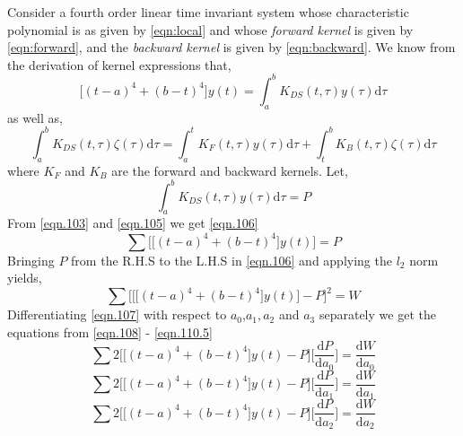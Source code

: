 \documentclass[letterpaper%
, twoside%
, 12pt%
,memoire%
, english%
,creativecommons,hyperref%
]{thETS}
\theoremstyle{newThmStyle}
\begin{document}
Consider a fourth order linear time invariant system whose characteristic polynomial is as given by \eqref{eqn:local} and whose \textit{forward kernel} is given by \eqref{eqn:forward}, and the \textit{backward kernel} is given by \eqref{eqn:backward}. 
We know from the derivation of kernel expressions \citep{RN120} that, 
\begin{equation}\label{eqn.103}
\bigg[(t-a)^4+(b-t)^4\bigg]y(t) = \int_{a}^{b} K_{DS}(t,\tau)y(\tau)\mathrm{d}\tau
\end{equation}
as well as,
\begin{equation}\label{eqn.104}
\int_{a}^{b} K_{DS}(t,\tau)\zeta(\tau)\mathrm{d}\tau = \int_{a}^{t}K_{F}(t,\tau)y(\tau)\mathrm{d}\tau + \int_{t}^{b}K_{B}(t,\tau)\zeta(\tau)\mathrm{d}\tau 
\end{equation}
where $K_F$ and $K_B$ are the forward and backward kernels. Let,
\begin{equation}\label{eqn.105}
\int_{a}^{b} K_{DS}(t,\tau)y(\tau)\mathrm{d}\tau = P
\end{equation}
From \eqref{eqn.103} and \eqref{eqn.105} we get \eqref{eqn.106}
\begin{equation}\label{eqn.106}
\sum\bigg[\big[(t-a)^4 + (b-t)^4\big]y(t)\bigg] = P
\end{equation}
Bringing $P$ from the R.H.S to the L.H.S in \eqref{eqn.106} and applying the $l_2$ norm yields,
\begin{equation}\label{eqn.107}
\sum\bigg[\bigg[\big[(t-a)^4 + (b-t)^4\big]y(t)\bigg] - P\bigg]^2 = W 
\end{equation}
Differentiating \eqref{eqn.107} with respect to $a_{0}$,$a_{1},a_{2}$ and $a_{3}$ separately we get the equations from \eqref{eqn.108} - \eqref{eqn.110.5}
\begin{equation}\label{eqn.108}
\sum 2\bigg[\big[(t-a)^4 + (b-t)^4\big]y(t) - P\bigg] \bigg[\frac{\mathrm{d}P}{\mathrm{d}a_{0}}\bigg] = \frac{\mathrm{d}W}{\mathrm{d}a_{0}}  
\end{equation}
\begin{equation}\label{eqn.109}
\sum 2\bigg[\big[(t-a)^4 + (b-t)^4\big]y(t) - P\bigg] \bigg[\frac{\mathrm{d}P}{\mathrm{d}a_{1}}\bigg] = \frac{\mathrm{d}W}{\mathrm{d}a_{1}}  
\end{equation}
\begin{equation}\label{eqn.110}
\sum 2\bigg[\big[(t-a)^4 + (b-t)^4\big]y(t) - P\bigg] \bigg[\frac{\mathrm{d}P}{\mathrm{d}a_{2}}\bigg] = \frac{\mathrm{d}W}{\mathrm{d}a_{2}} 
\end{equation}
\end{document}
